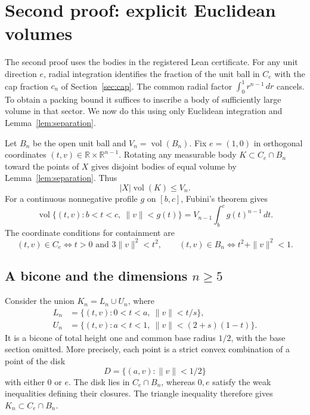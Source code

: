 \documentclass[11pt,a4paper]{article}
\theoremstyle{remark}
\newcommand{\R}{\mathbb{R}}
\newcommand{\vol}{\operatorname{vol}}
\begin{document}
\section{Second proof: explicit Euclidean volumes}\label{sec:volume}

The second proof uses the bodies in the registered Lean certificate. For any unit direction $e$, radial integration identifies the fraction of the unit ball in $C_e$ with the cap fraction $c_n$ of Section~\ref{sec:cap}. The common radial factor $\int_0^1r^{n-1}\,dr$ cancels. To obtain a packing bound it suffices to inscribe a body of sufficiently large volume in that sector. We now do this using only Euclidean integration and Lemma~\ref{lem:separation}.

Let $B_n$ be the open unit ball and $V_n=\vol(B_n)$. Fix $e=(1,0)$ in orthogonal coordinates $(t,v)\in\R\times\R^{n-1}$. Rotating any measurable body $K\subset C_e\cap B_n$ toward the points of $X$ gives disjoint bodies of equal volume by Lemma~\ref{lem:separation}. Thus
\begin{equation}\label{eq:volpacking}
 |X|\vol(K)\leq V_n.
\end{equation}
For a continuous nonnegative profile $g$ on $[b,c]$, Fubini's theorem gives
\begin{equation}\label{eq:profilevolume}
 \vol\{(t,v):b<t<c,\ \|v\|<g(t)\}
 =V_{n-1}\int_b^c g(t)^{n-1}\,dt.
\end{equation}
The coordinate conditions for containment are
\begin{equation}\label{eq:coordinates}
 (t,v)\in C_e\iff t>0\text{ and }3\|v\|^2<t^2,
 \qquad (t,v)\in B_n\iff t^2+\|v\|^2<1.
\end{equation}

\subsection{A bicone and the dimensions \texorpdfstring{$n\geq5$}{n >= 5}}

Consider the union $K_n=L_n\cup U_n$, where
\begin{align*}
 L_n&=\{(t,v):0<t<a,\ \|v\|<t/s\},\\
 U_n&=\{(t,v):a<t<1,\ \|v\|<(2+s)(1-t)\}.
\end{align*}
It is a bicone of total height one and common base radius $1/2$, with the base section omitted. More precisely, each point is a strict convex combination of a point of the disk
\[
 D=\{(a,v):\|v\|<1/2\}
\]
with either $0$ or $e$. The disk lies in $C_e\cap B_n$, whereas $0,e$ satisfy the weak inequalities defining their closures. The triangle inequality therefore gives $K_n\subset C_e\cap B_n$.
\end{document}
